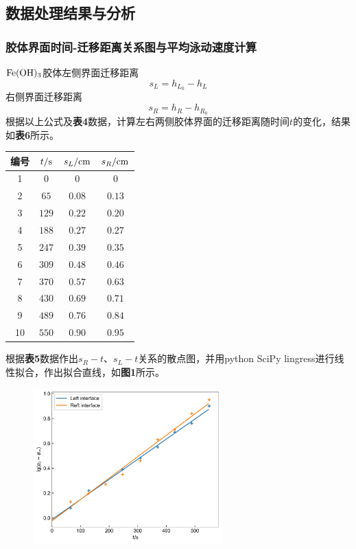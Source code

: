 \documentclass[12pt]{article}
\begin{document}
 \subsection{数据处理结果与分析}
 \subsubsection{胶体界面时间-迁移距离关系图与平均泳动速度计算}
$\rm Fe(OH)_{3}$胶体左侧界面迁移距离
$$s_{L}=h_{L_{0}}-h_{L}
$$
右侧界面迁移距离
$$s_{R}=h_{R}-h_{R_{0}}
$$
根据以上公式及\textbf{表4}数据，计算左右两侧胶体界面的迁移距离随时间$t$的变化，结果如\textbf{表6}所示。
\begin{table}[h]
	\centering
	\begin{tabular}{cccc}
		\toprule
		编号 & $t/{\rm s}$ & $s_{L}/{\rm cm}$ & $s_{R}/{\rm cm}$  \\
		\midrule
		1 & $0$ & $0$ & $0$  \\
		2 & $65$ & $0.08$ & $0.13$  \\
		3 & $129$ & $0.22$ & $0.20$  \\
		4 & $188$ & $0.27$ & $0.27$  \\
		5 & $247$ & $0.39$ & $0.35$  \\
		6 & $309$ & $0.48$ & $0.46$  \\
		7 & $370$ & $0.57$ & $0.63$  \\
		8 & $430$ & $0.69$ & $0.71$  \\
		9 & $489$ & $0.76$ & $0.84$  \\
		10 & $550$ & $0.90$ & $0.95$  \\
		\bottomrule
	\end{tabular}
\end{table}
\par
根据\textbf{表5}数据作出$s_{R}-t$、$s_{L}-t$关系的散点图，并用python SciPy lingress进行线性拟合，作出拟合直线，如\textbf{图1}所示。
\begin{figure}[h]
	\centering
	\includegraphics[width=0.65\textwidth]{1.jpg}
\end{figure}
\end{document}
